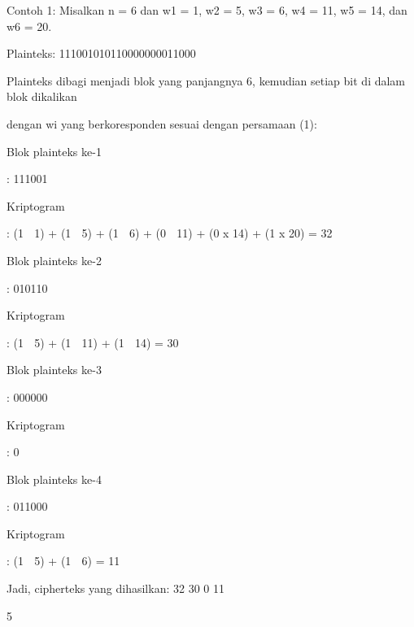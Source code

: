 \documentclass{article}
\begin{document}

Contoh 1:  Misalkan n = 6 dan w1 = 1, w2 = 5, w3 = 6,  w4 = 11, w5 = 14, dan w6 = 20.

Plainteks:  111001010110000000011000

Plainteks dibagi menjadi blok yang panjangnya 6, kemudian setiap bit di dalam blok dikalikan 

dengan wi yang berkoresponden sesuai dengan persamaan (1):

 Blok plainteks ke-1 

: 111001 

 Kriptogram 


: (1  1) + (1  5) + (1  6) +  (0  11) + (0 x 14) + (1 x 20)   = 32

 Blok plainteks ke-2 

: 010110 

 Kriptogram 


: (1  5) + (1  11) + (1  14) = 30

 Blok plainteks ke-3 

: 000000 

 Kriptogram 


: 0

 Blok plainteks ke-4 

: 011000 

 Kriptogram 


: (1  5) + (1  6) = 11

Jadi, cipherteks yang dihasilkan:  32  30  0  11

5
\end{document}
